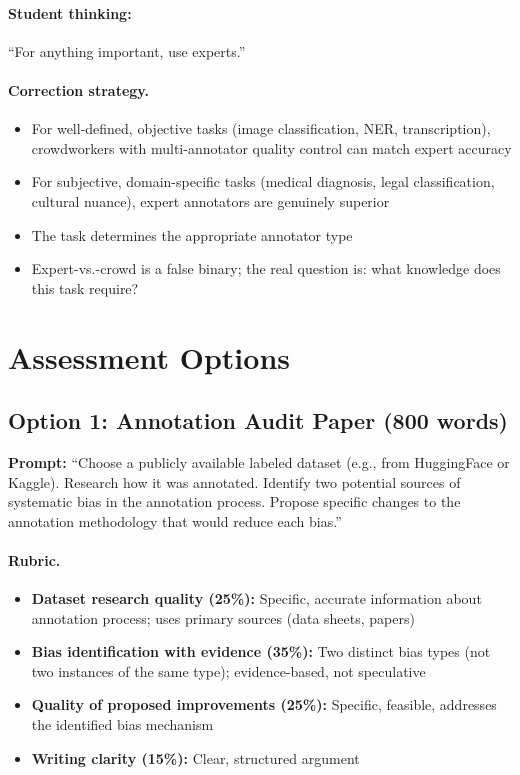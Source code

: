 \paragraph{Student thinking:} ``For anything important, use experts.''

\paragraph{Correction strategy.}
\begin{itemize}
    \item For well-defined, objective tasks (image classification, NER, transcription), crowdworkers with multi-annotator quality control can match expert accuracy
    \item For subjective, domain-specific tasks (medical diagnosis, legal classification, cultural nuance), expert annotators are genuinely superior
    \item The task determines the appropriate annotator type
    \item Expert-vs.-crowd is a false binary; the real question is: what knowledge does this task require?
\end{itemize}

\section{Assessment Options}

\subsection{Option 1: Annotation Audit Paper (800 words)}

\textbf{Prompt:} ``Choose a publicly available labeled dataset (e.g., from HuggingFace or Kaggle). Research how it was annotated. Identify two potential sources of systematic bias in the annotation process. Propose specific changes to the annotation methodology that would reduce each bias.''

\paragraph{Rubric.}
\begin{itemize}
    \item \textbf{Dataset research quality (25\%):} Specific, accurate information about annotation process; uses primary sources (data sheets, papers)
    \item \textbf{Bias identification with evidence (35\%):} Two distinct bias types (not two instances of the same type); evidence-based, not speculative
    \item \textbf{Quality of proposed improvements (25\%):} Specific, feasible, addresses the identified bias mechanism
    \item \textbf{Writing clarity (15\%):} Clear, structured argument
\end{itemize}

